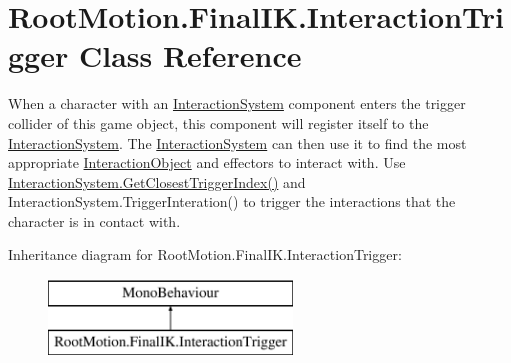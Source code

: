 \hypertarget{class_root_motion_1_1_final_i_k_1_1_interaction_trigger}{}\section{Root\+Motion.\+Final\+I\+K.\+Interaction\+Trigger Class Reference}
\label{class_root_motion_1_1_final_i_k_1_1_interaction_trigger}


When a character with an \mbox{\hyperlink{class_root_motion_1_1_final_i_k_1_1_interaction_system}{Interaction\+System}} component enters the trigger collider of this game object, this component will register itself to the \mbox{\hyperlink{class_root_motion_1_1_final_i_k_1_1_interaction_system}{Interaction\+System}}. The \mbox{\hyperlink{class_root_motion_1_1_final_i_k_1_1_interaction_system}{Interaction\+System}} can then use it to find the most appropriate \mbox{\hyperlink{class_root_motion_1_1_final_i_k_1_1_interaction_object}{Interaction\+Object}} and effectors to interact with. Use \mbox{\hyperlink{class_root_motion_1_1_final_i_k_1_1_interaction_system_a81d9ef8e0ca4a4348eae92acc5269983}{Interaction\+System.\+Get\+Closest\+Trigger\+Index()}} and Interaction\+System.\+Trigger\+Interation() to trigger the interactions that the character is in contact with.  


Inheritance diagram for Root\+Motion.\+Final\+I\+K.\+Interaction\+Trigger\+:\begin{figure}[H]
\begin{center}
\leavevmode
\includegraphics[height=2.000000cm]{class_root_motion_1_1_final_i_k_1_1_interaction_trigger}
\end{center}
\end{figure}
